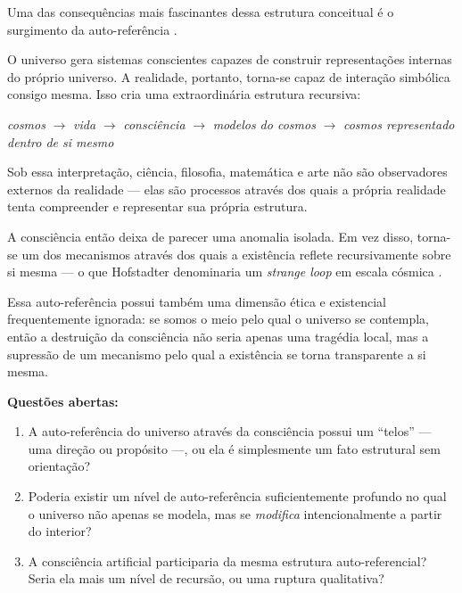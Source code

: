 \documentclass[12pt,a4paper]{article}
\begin{document}
Uma das consequências mais fascinantes dessa estrutura conceitual é o
surgimento da auto-referência \citep{hofstadter1979, hofstadter2007}.

O universo gera sistemas conscientes capazes de construir representações
internas do próprio universo. A realidade, portanto, torna-se capaz de
interação simbólica consigo mesma. Isso cria uma extraordinária estrutura
recursiva:

\begin{center}
  \textit{cosmos} $\rightarrow$ \textit{vida}
  $\rightarrow$ \textit{consciência}
  $\rightarrow$ \textit{modelos do cosmos}
  $\rightarrow$ \textit{cosmos representado dentro de si mesmo}
\end{center}

Sob essa interpretação, ciência, filosofia, matemática e arte não são
observadores externos da realidade — elas são processos através dos quais
a própria realidade tenta compreender e representar sua própria estrutura.

A consciência então deixa de parecer uma anomalia isolada. Em vez disso,
torna-se um dos mecanismos através dos quais a existência reflete
recursivamente sobre si mesma — o que Hofstadter denominaria um
\textit{strange loop} em escala cósmica \citep{hofstadter2007}.

Essa auto-referência possui também uma dimensão ética e existencial
frequentemente ignorada: se somos o meio pelo qual o universo se contempla,
então a destruição da consciência não seria apenas uma tragédia local,
mas a supressão de um mecanismo pelo qual a existência se torna
transparente a si mesma.

\begin{tcolorbox}[questionbox]
  \textbf{Questões abertas:}
  \begin{enumerate}
    \item A auto-referência do universo através da consciência possui
      um ``telos'' — uma direção ou propósito —, ou ela é
      simplesmente um fato estrutural sem orientação?
    \item Poderia existir um nível de auto-referência suficientemente
      profundo no qual o universo não apenas se modela, mas se
      \textit{modifica} intencionalmente a partir do interior?
    \item A consciência artificial participaria da mesma estrutura
      auto-referencial? Seria ela mais um nível de recursão,
      ou uma ruptura qualitativa?
  \end{enumerate}
\end{tcolorbox}
\end{document}
